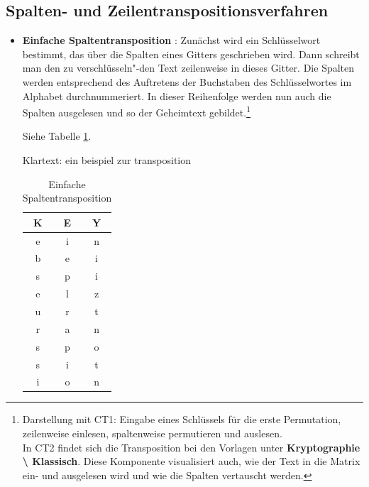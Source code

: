 \begin{refsegment}
\subsection[Spalten- und Zeilentranspositionsverfahren]
    {Spalten- und Zeilentranspositionsverfahren\footnotemark}

\begin{itemize}\sloppy

\item \textbf{Einfache Spaltentransposition} \cite{Savard1999}: Zunächst wird
   ein Schlüsselwort bestimmt, das über die Spalten eines Gitters geschrieben
   wird. Dann schreibt man den zu verschlüsseln"-den Text zeilenweise in dieses
   Gitter.
   Die Spalten werden entsprechend des Auftretens der Buchstaben des
   Schlüsselwortes im Alphabet durchnummeriert. In dieser Reihenfolge werden
   nun auch die Spalten ausgelesen und so der Geheimtext gebildet.\footnote{%
   Darstellung mit CT1: Eingabe eines Schlüssels für die erste Permutation,
   zeilenweise einlesen, spaltenweise permutieren und auslesen.\\
   In CT2 findet sich die Transposition bei den Vorlagen unter
   \textbf{Kryptographie \textbackslash{} Klassisch}. Diese Komponente visualisiert
   auch, wie der Text in die Matrix ein- und ausgelesen wird und wie die Spalten
   vertauscht werden.
   }

   Siehe Tabelle \ref{PaP_SimpColTransp_table-reference}.
	
   Klartext: ein beispiel zur transposition

   \begin{table}[ht]
   \begin{center}
   \begin{tabular}{|c|c|c|}
   \hline
	K & E & Y \\
   \hline
	e & i & n \\
	b & e & i \\
	s & p & i \\
	e & l & z \\
	u & r & t \\
	r & a & n \\
	s & p & o \\
	s & i & t \\
	i & o & n \\
   \hline
   \end{tabular}
   \caption{Einfache Spaltentransposition}
   \label{PaP_SimpColTransp_table-reference}
   \end{center}
   \end{table}


\end{itemize}
\end{refsegment}
